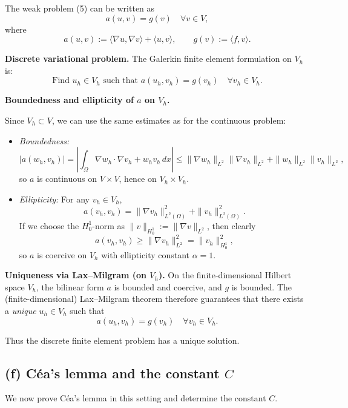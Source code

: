 The weak problem (5) can be written as
\[
    a(u,v) = g(v)\quad\forall v\in V,
\]
where
\[
    a(u,v) := \langle \nabla u,\nabla v\rangle + \langle u,v\rangle,
    \qquad
    g(v) := \langle f,v\rangle.
\]

\textbf{Discrete variational problem.}
The Galerkin finite element formulation on \(V_h\) is:
\[
    \boxed{
        \text{Find } u_h\in V_h \text{ such that }
        a(u_h,v_h) = g(v_h)\quad\forall v_h\in V_h.
    }
\]

\textbf{Boundedness and ellipticity of $a$ on $V_h$.}

Since \(V_h\subset V\), we can use the same estimates as for the continuous problem:

\begin{itemize}
    \item \emph{Boundedness:}
          \[
              |a(w_h,v_h)|
              = \left|\int_\Omega \nabla w_h\cdot\nabla v_h + w_h v_h\,dx\right|
              \le \|\nabla w_h\|_{L^2}\|\nabla v_h\|_{L^2}
              + \|w_h\|_{L^2}\|v_h\|_{L^2},
          \]
          so \(a\) is continuous on \(V\times V\), hence on \(V_h\times V_h\).

    \item \emph{Ellipticity:} For any \(v_h\in V_h\),
          \[
              a(v_h,v_h)
              = \|\nabla v_h\|_{L^2(\Omega)}^2 + \|v_h\|_{L^2(\Omega)}^2.
          \]
          If we choose the \(H^1_0\)-norm as
          \(\|v\|_{H^1_0} := \|\nabla v\|_{L^2}\), then clearly
          \[
              a(v_h,v_h) \ge \|\nabla v_h\|_{L^2}^2 = \|v_h\|_{H^1_0}^2,
          \]
          so \(a\) is coercive on \(V_h\) with ellipticity constant \(\alpha=1\).
\end{itemize}

\textbf{Uniqueness via Lax--Milgram (on $V_h$).}
On the finite-dimensional Hilbert space \(V_h\), the bilinear form \(a\) is
bounded and coercive, and \(g\) is bounded. The (finite-dimensional) Lax--Milgram theorem
therefore guarantees that there exists a \emph{unique} \(u_h\in V_h\) such that
\[
    a(u_h,v_h) = g(v_h)\quad\forall v_h\in V_h.
\]

Thus the discrete finite element problem has a unique solution.

\subsection*{(f) Céa's lemma and the constant $C$}

We now prove Céa's lemma in this setting and determine the constant \(C\).

